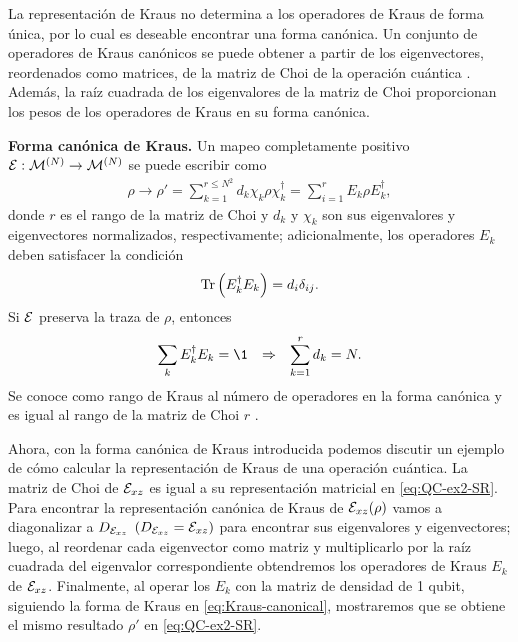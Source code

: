 La representación de Kraus no determina a los operadores
de Kraus de forma única, por lo cual es deseable encontrar
una forma canónica. Un conjunto de operadores de Kraus 
canónicos se puede obtener a partir de los eigenvectores,
reordenados como matrices, de la matriz de Choi de la 
operación cuántica \cite{bengtsson_zyczkowski_2017}.
Además, la raíz cuadrada de los eigenvalores de la 
matriz de Choi proporcionan los pesos de los operadores
de Kraus en su forma canónica.  

\textbf{Forma canónica de Kraus.} Un mapeo completamente 
positivo $\mathcal{E}:\mathcal{M}^{(N)}\to\mathcal{M}^{(N)}$ se
puede escribir como
\begin{align}
\rho \longrightarrow \rho' = 
\sum_{k=1}^{r\leq N^2}d_k\chi_k\rho\chi_k^{\dagger}
= \sum_{i=1}^rE_k\rho E_k^{\dagger},
\label{eq:Kraus-canonical}
\end{align}
donde $r$ es el rango de la matriz de Choi y $d_k$ y $\chi_k$ 
son sus eigenvalores y eigenvectores normalizados, respectivamente; 
adicionalmente, los operadores $E_k$ deben satisfacer la condición
\begin{align}
  \Tr\qty(E_k^{\dagger}E_k)=d_i\delta_{ij}.
  \label{eq:Tr-Kraus-canonical}
\end{align}
Si $\mathcal{E}$ preserva la 
traza de $\rho$, entonces
\begin{align}
  \sum_kE_k^{\dagger}E_k=\1
  &&\Rightarrow&&
  \sum_{k=1}^rd_k=N .
  \label{eq:completeness-Kraus-canonical}
\end{align}
Se conoce como rango de Kraus al número de operadores 
en la forma canónica y es igual al rango de la matriz de Choi $r$
\cite{bengtsson_zyczkowski_2017}.

Ahora, con la forma canónica de Kraus introducida podemos
discutir un ejemplo de cómo calcular la representación de Kraus
de una operación cuántica.
La matriz de Choi de $\mathcal{E}_{xz}$ es igual a  su representación
matricial en \eqref{eq:QC-ex2-SR}.
Para encontrar la representación canónica de Kraus de $\mathcal{E}_{xz}\qty(\rho)$
vamos a diagonalizar a $D_{\mathcal{E}_{xz}}$ $(D_{\mathcal{E}_{xz}}=\mathcal{E}_{xz})$
para encontrar
sus eigenvalores y eigenvectores; luego, al reordenar
cada eigenvector como matriz y multiplicarlo por la raíz cuadrada
del eigenvalor correspondiente obtendremos los operadores 
de Kraus $E_k$ de $\mathcal{E}_{xz}$. Finalmente, al operar los $E_k$ 
con la matriz de densidad de 1 qubit, siguiendo la forma de 
Kraus en \eqref{eq:Kraus-canonical}, mostraremos que se obtiene el 
mismo resultado $\rho'$ en \eqref{eq:QC-ex2-SR}.

